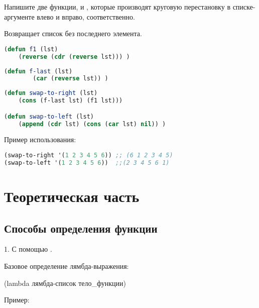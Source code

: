\documentclass[a4paper,oneside,12pt]{extreport}
\begin{document}
\begin{task}
    Напишите две функции,  и , 
    которые производят круговую перестановку в списке-аргументе влево и вправо, соответственно.
    
    Возвращает список без последнего элемента.
    \begin{lstlisting}[language=Lisp]
(defun f1 (lst)
    (reverse (cdr (reverse lst))) )
    \end{lstlisting}

    \begin{lstlisting}[language=Lisp]
(defun f-last (lst)
        (car (reverse lst)) )
    \end{lstlisting}

    \begin{lstlisting}[language=Lisp]
(defun swap-to-right (lst)
    (cons (f-last lst) (f1 lst)))

(defun swap-to-left (lst)
	(append (cdr lst) (cons (car lst) nil)) )
    \end{lstlisting}

    Пример использования:
    \begin{lstlisting}[language=Lisp]
(swap-to-right '(1 2 3 4 5 6)) ;; (6 1 2 3 4 5)
(swap-to-left '(1 2 3 4 5 6))  ;;(2 3 4 5 6 1)
    \end{lstlisting}

\end{task}
      
      

    

\newpage

\section*{Теоретическая часть}

\subsection*{Способы определения функции}


1. С помощью . 

Базовое определение лямбда-выражения:

(lambda лямбда-список тело\_функции)

Пример:
\end{document}
